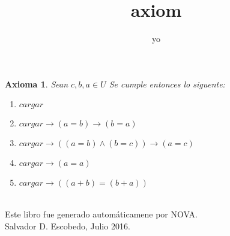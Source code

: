 ﻿\documentclass[12pt]{book}
\title{axiom}
\author{yo}
\date{}
\newtheorem{axiom}{Axioma}[chapter]
\begin{document}
\maketitle

\begin{axiom}
Sean $c,b,a\in U$
Se cumple entonces lo siguente: 
\begin{enumerate}
\item $cargar$
\item $cargar\rightarrow (a=b)\rightarrow (b=a)$
\item $cargar\rightarrow ((a=b)\wedge (b=c))\rightarrow (a=c)$
\item $cargar\rightarrow (a=a)$
\item $cargar\rightarrow ((a+b)=(b+a))$
\end{enumerate}
\label{ax: 0}
\end{axiom}
\\\small{Este libro fue generado automáticamene por NOVA.} \\
\small{Salvador D. Escobedo, Julio 2016}.
\end{document}
